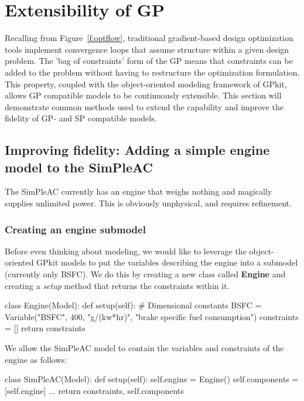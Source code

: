 \chapter{Extensibility of GP}
\label{ch3:extensibility}

Recalling from Figure~\ref{f:optflow}, traditional gradient-based design optimization tools implement
convergence loops that assume structure within a given design problem.
The 'bag of constraints' form of the GP means that constraints can be
added to the problem without
having to restructure the optimization formulation. This property,
coupled with the object-oriented modeling framework of GPkit, allows
\gls{GP} compatible models to be continuously extensible.
This section will demonstrate common methods used to extend the capability
and improve the fidelity of \gls{GP}- and \gls{SP} compatible models.

\section{Improving fidelity: Adding a simple engine model to the SimPleAC}
\label{s:engine}

The SimPleAC currently has an engine that weighs nothing and magically supplies
unlimited power. This is obviously unphysical, and requires refinement.

\subsection{Creating an engine submodel}

Before even thinking about modeling, we would like to leverage the object-oriented
GPkit models to put the variables describing the engine into a submodel (currently only
BSFC). We do this by creating a new class called \textbf{Engine} and creating a \textit{setup}
method that returns the constraints within it.

\begin{python}
    class Engine(Model):
        def setup(self):
            # Dimensional constants
            BSFC = Variable("BSFC", 400, "g/(kw*hr)", "brake specific fuel consumption")
            constraints = []
            return constraints
\end{python}

We allow the SimPleAC model to contain the variables and constraints of the engine
as follows:

\begin{python}
    class SimPleAC(Model):
        def setup(self):
            self.engine = Engine()
            self.components = [self.engine]
            ...
            return constraints, self.components
\end{python}


